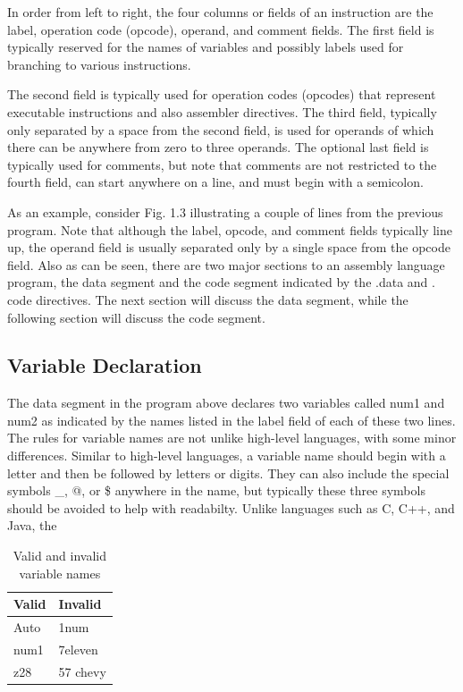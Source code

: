 \documentclass[10pt]{book}
\begin{document}
In order from left to right, the four columns or fields of an instruction are the label, operation code (opcode), operand, and comment fields. The first field is typically reserved for the names of variables and possibly labels used for branching to various instructions.

The second field is typically used for operation codes (opcodes) that represent executable instructions and also assembler directives. The third field, typically only separated by a space from the second field, is used for operands of which there can be anywhere from zero to three operands. The optional last field is typically used for comments, but note that comments are not restricted to the fourth field, can start anywhere on a line, and must begin with a semicolon.

As an example, consider Fig. 1.3 illustrating a couple of lines from the previous program. Note that although the label, opcode, and comment fields typically line up, the operand field is usually separated only by a single space from the opcode field. Also as can be seen, there are two major sections to an assembly language program, the data segment and the code segment indicated by the .data and . code directives. The next section will discuss the data segment, while the following section will discuss the code segment.

\subsection{Variable Declaration}
The data segment in the program above declares two variables called num1 and num2 as indicated by the names listed in the label field of each of these two lines. The rules for variable names are not unlike high-level languages, with some minor differences. Similar to high-level languages, a variable name should begin with a letter and then be followed by letters or digits. They can also include the special symbols \_, @, or \$ anywhere in the name, but typically these three symbols should be avoided to help with readabilty. Unlike languages such as C, C++, and Java, the

\begin{table}[t]
\centering
\begin{tabular}{|l|l|}
\hline
Valid & Invalid \\
\hline
Auto & 1num \\
\hline
num1 & 7eleven \\
\hline
z28 & 57 chevy \\
\hline
\end{tabular}
\caption{Valid and invalid variable names}
\end{table}
\end{document}
